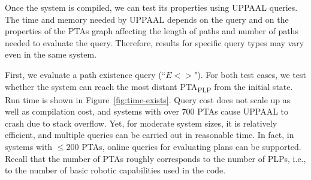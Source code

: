 \documentclass[letterpaper]{article}
\newcommand\rNote[1]{\todo[inline, author=Ronen, color=yellow]{#1}}
\newcommand\aNote[1]{\todo[inline, author=Alex, color=GreenYellow]{#1}}
\newcommand{\frameImage}[4]{
\begin{figure}[H] 
  \centerline{
    \fcolorbox{frameColor}{white}{
        \texttt{[image: \#1]} } }
    \caption{#4}
    \label{fig:#1}
\end{figure}
}
\begin{document}
Once the system is compiled, we can test its properties using UPPAAL queries. The time and memory needed  by UPPAAL depends on the query and on the properties of the PTAs graph affecting the length of paths and number of paths needed to evaluate the query. Therefore, results for specific query types may vary even in the same system. 






First, we evaluate a path existence query (``$E<>$"). 
For both test cases, we test whether the system can reach the most distant PTA\textsubscript{PLP} from the initial state.
%
Run time is
shown in Figure~\ref{fig:time-exists}. %
Query cost does not scale up as well as compilation cost,
and systems with over 700 PTAs cause UPPAAL to crash due to stack overflow. Yet,  for moderate system sizes, it is relatively efficient, and multiple queries can be carried out in reasonable time. In fact, in systems with $\leq  200$ PTAs, online queries for evaluating plans can be supported.
Recall that the number of PTAs roughly corresponds to the number of PLPs,
i.e., to the number of basic robotic capabilities used in the code.
\end{document}
